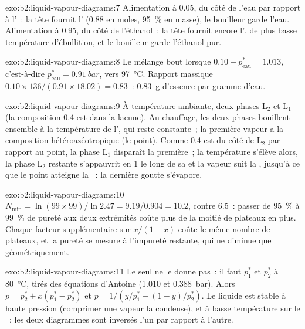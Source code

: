 \begin{solution}{exo:b2:liquid-vapour-diagrams:7}
Alimentation à 0.05, du côté de l'eau par rapport à l'~: la tête fournit l'
(0.88 en moles, 95~\% en masse), le bouilleur garde l'eau. Alimentation à 0.95, du côté de
l'éthanol~: la tête fournit encore l', de plus basse température d'ébullition,
et le bouilleur garde l'éthanol pur.
\end{solution}

\begin{solution}{exo:b2:liquid-vapour-diagrams:8}
Le mélange bout lorsque $0.10 + p^*_{\text{eau}} = 1.013$, c'est-à-dire
$p^*_{\text{eau}} = \qty{0.91}{bar}$, vers \qty{97}{\degreeCelsius}. Rapport massique
$0.10 \times 136/(0.91 \times 18.02) = 0.83$~: \qty{0.83}{g} d'essence par gramme
d'eau.
\end{solution}

\begin{solution}{exo:b2:liquid-vapour-diagrams:9}
À température ambiante, deux phases L$_2$ et L$_1$ (la composition 0.4 est dans la
lacune). Au chauffage, les deux phases bouillent ensemble à la température de
l', qui reste constante~; la première vapeur a la composition
hétéroazéotropique (le point). Comme 0.4 est du côté de L$_2$ par rapport au point, la phase
L$_1$ disparaît la première~; la température s'élève alors, la phase L$_2$ restante
s'appauvrit en 1 le long de sa  et la vapeur suit la , jusqu'à ce que
le point atteigne la ~: la dernière goutte s'évapore.
\end{solution}

\begin{solution}{exo:b2:liquid-vapour-diagrams:10}
$N_{\min} = \ln(99 \times 99)/\ln 2.47 = 9.19/0.904 = 10.2$, contre 6.5~: passer
de 95~\% à 99~\% de pureté aux deux extrémités coûte plus de la moitié de plateaux
en plus. Chaque facteur supplémentaire sur $x/(1 - x)$ coûte le même nombre de plateaux, et
la pureté se mesure à l'impureté restante, qui ne diminue que géométriquement.
\end{solution}

\begin{solution}{exo:b2:liquid-vapour-diagrams:11}
Le  seul ne le donne pas~: il faut $p_1^*$ et $p_2^*$ à
\qty{80}{\degreeCelsius}, tirés des équations d'Antoine (1.010 et
\qty{0.388}{bar}). Alors $p = p_2^* + x(p_1^* - p_2^*)$ et $p = 1/(y/p_1^* + (1 -
y)/p_2^*)$. Le liquide est stable à haute pression (comprimer une vapeur
la condense), et à basse température sur le ~: les deux diagrammes
sont inversés l'un par rapport à l'autre.
\end{solution}

